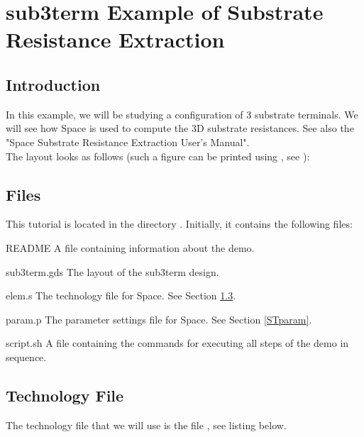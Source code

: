\chapter{sub3term Example of Substrate Resistance Extraction}
\section{Introduction}
\label{STintro}
In this example, we will be studying a configuration of 3 substrate terminals.
We will see how Space is used to compute the 3D substrate resistances.
See also the "Space Substrate Resistance Extraction User's Manual".
\\[1 ex]
The layout looks as follows (such a figure can be printed using , see
):

\begin{figure}[h]
\centerline{}
\end{figure}

\section{Files}
This tutorial is located in the directory .
Initially, it contains the following files:
\begin{filelist}
\item[README] A file containing information about the demo.
\item[sub3term.gds] The layout of the sub3term design.
\item[elem.s] The technology file for Space. See Section \ref{STtech}.
\item[param.p] The parameter settings file for Space. See Section \ref{STparam}.
\item[script.sh] A file containing the commands for executing all
steps of the demo in sequence.
\end{filelist}

\section{Technology File}
\label{STtech}
The technology file that we will use is the file , see listing below.


